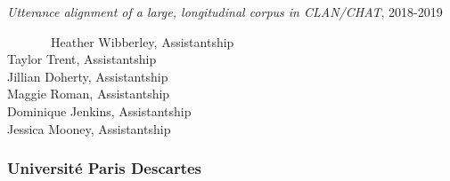 \documentclass[10pt,a4paper,]{article}
\begin{document}
\emph{Utterance alignment of a large, longitudinal corpus in CLAN/CHAT}, 2018-2019

~~~~~~~Heather Wibberley, Assistantship\\
\hspace*{0.333em}\hspace*{0.333em}\hspace*{0.333em}\hspace*{0.333em}\hspace*{0.333em}\hspace*{0.333em}\hspace*{0.333em}Taylor Trent, Assistantship\\
\hspace*{0.333em}\hspace*{0.333em}\hspace*{0.333em}\hspace*{0.333em}\hspace*{0.333em}\hspace*{0.333em}\hspace*{0.333em}Jillian Doherty, Assistantship\\
\hspace*{0.333em}\hspace*{0.333em}\hspace*{0.333em}\hspace*{0.333em}\hspace*{0.333em}\hspace*{0.333em}\hspace*{0.333em}Maggie Roman, Assistantship\\
\hspace*{0.333em}\hspace*{0.333em}\hspace*{0.333em}\hspace*{0.333em}\hspace*{0.333em}\hspace*{0.333em}\hspace*{0.333em}Dominique Jenkins, Assistantship\\
\hspace*{0.333em}\hspace*{0.333em}\hspace*{0.333em}\hspace*{0.333em}\hspace*{0.333em}\hspace*{0.333em}\hspace*{0.333em}Jessica Mooney, Assistantship

\hypertarget{universituxe9-paris-descartes}{%
\subsubsection{Université Paris Descartes}\label{universituxe9-paris-descartes}}
\end{document}
